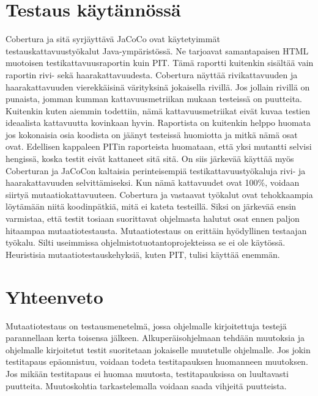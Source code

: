\documentclass[finnish]{tktltiki2}
\begin{document}
\section{Testaus käytännössä}
Cobertura ja sitä syrjäyttävä JaCoCo ovat käytetyimmät testauskattavuustyökalut Java-ympäristössä. Ne tarjoavat samantapaisen HTML muotoisen testikattavuusraportin kuin PIT. Tämä raportti kuitenkin sisältää vain raportin rivi- sekä haarakattavuudesta. Cobertura näyttää rivikattavuuden ja haarakattavuuden vierekkäisinä värityksinä jokaisella rivillä. Jos jollain rivillä on punaista, jomman kumman kattavuusmetriikan mukaan testeissä on puutteita. Kuitenkin kuten aiemmin todettiin, nämä kattavuusmetriikat eivät kuvaa testien ideaalista kattavuutta kovinkaan hyvin. Raportista on kuitenkin helppo huomata jos kokonaisia osia koodista on jäänyt testeissä huomiotta ja mitkä nämä osat ovat. Edellisen kappaleen PITin raporteista huomataan, että yksi mutantti selvisi hengissä, koska testit eivät kattaneet sitä sitä. On siis järkevää käyttää myös Coberturan ja JaCoCon kaltaisia perinteisempiä testikattavuustyökaluja rivi- ja haarakattavuuden selvittämiseksi. Kun nämä kattavuudet ovat 100\%, voidaan siirtyä mutaatiokattavuuteen. Cobertura ja vastaavat työkalut ovat tehokkaampia löytämään niitä koodinpätkiä, mitä ei kateta testeillä. Siksi on järkevää ensin varmistaa, että testit tosiaan suorittavat ohjelmasta halutut osat ennen paljon hitaampaa mutaatiotestausta. Mutaatiotestaus on erittäin hyödyllinen testaajan työkalu. Silti useimmissa ohjelmistotuotantoprojekteissa se ei ole käytössä. Heuristisia mutaatiotestauskehyksiä, kuten PIT, tulisi käyttää enemmän. 

\section{Yhteenveto}
Mutaatiotestaus on testausmenetelmä, jossa ohjelmalle kirjoitettuja testejä parannellaan kerta toisensa jälkeen. Alkuperäisohjelmaan tehdään muutoksia ja ohjelmalle kirjoitetut testit suoritetaan jokaiselle muutetulle ohjelmalle. Jos jokin testitapaus epäonnistuu, voidaan todeta testitapauksen huomanneen muutoksen. Jos mikään testitapaus ei huomaa muutosta, testitapauksissa on luultavasti puutteita. Muutoskohtia tarkastelemalla voidaan saada vihjeitä puutteista. 
\end{document}
